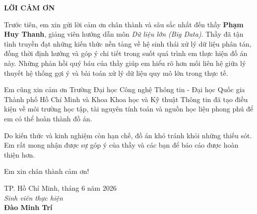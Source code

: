 \newpage
\thispagestyle{plain}
\vspace*{0.5cm}
\begin{center}
    {\LARGE\textbf{\MakeUppercase{Lời cảm ơn}}}
\end{center}
\vspace{0.4cm}

Trước tiên, em xin gửi lời cảm ơn chân thành và sâu sắc nhất đến thầy
\textbf{Phạm Huy Thanh}, giảng viên hướng dẫn môn \textit{Dữ liệu lớn (Big Data)}.
Thầy đã tận tình truyền đạt những kiến thức nền tảng về hệ sinh thái xử lý
dữ liệu phân tán, đồng thời định hướng và góp ý chi tiết trong suốt quá trình
em thực hiện đồ án này. Những phản hồi quý báu của thầy giúp em hiểu rõ hơn
mối liên hệ giữa lý thuyết hệ thống gợi ý và bài toán xử lý dữ liệu quy mô lớn
trong thực tế.

\vspace{0.25cm}
Em cũng xin cảm ơn Trường Đại học Công nghệ Thông tin - Đại học Quốc gia
Thành phố Hồ Chí Minh và Khoa Khoa học và Kỹ thuật Thông tin đã tạo điều kiện
về môi trường học tập, tài nguyên tính toán và nguồn học liệu phong phú để em
có thể hoàn thành đồ án.

\vspace{0.25cm}
Do kiến thức và kinh nghiệm còn hạn chế, đồ án khó tránh khỏi những thiếu sót.
Em rất mong nhận được sự góp ý của thầy và các bạn để báo cáo được hoàn thiện hơn.

\vspace{0.25cm}
Em xin chân thành cảm ơn!

\vspace{0.8cm}
\begin{flushright}
    \begin{minipage}{0.6\textwidth}
        \centering
        TP. Hồ Chí Minh, tháng 6 năm 2026\\[0.2cm]
        \textit{Sinh viên thực hiện}\\[1.8cm]
        \textbf{Đào Minh Trí}
    \end{minipage}
\end{flushright}
